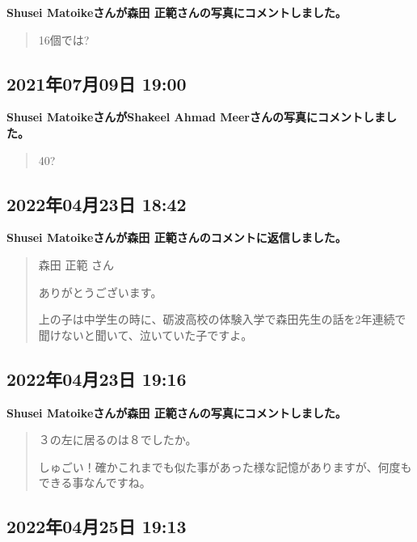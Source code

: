 \textbf{Shusei Matoikeさんが森田 正範さんの写真にコメントしました。}

\begin{quote}
16個では?
\end{quote}

\subsection*{2021年07月09日 19:00}

\textbf{Shusei MatoikeさんがShakeel Ahmad Meerさんの写真にコメントしました。}

\begin{quote}
40?
\end{quote}

\subsection*{2022年04月23日 18:42}

\textbf{Shusei Matoikeさんが森田 正範さんのコメントに返信しました。}

\begin{quote}
森田 正範 さん

ありがとうございます。

上の子は中学生の時に、砺波高校の体験入学で森田先生の話を2年連続で聞けないと聞いて、泣いていた子ですよ。
\end{quote}

\subsection*{2022年04月23日 19:16}

\textbf{Shusei Matoikeさんが森田 正範さんの写真にコメントしました。}

\begin{quote}
３の左に居るのは８でしたか。

しゅごい！確かこれまでも似た事があった様な記憶がありますが、何度もできる事なんですね。
\end{quote}

\subsection*{2022年04月25日 19:13}

